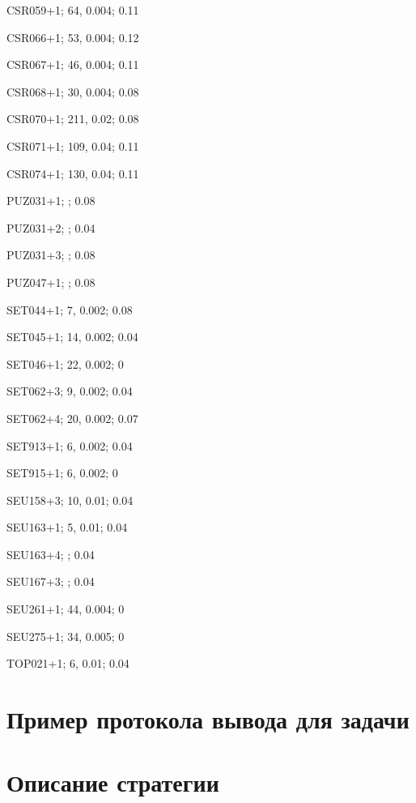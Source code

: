 CSR059+1; 64, 0.004; 0.11

CSR066+1; 53, 0.004; 0.12

CSR067+1; 46, 0.004; 0.11

CSR068+1; 30, 0.004; 0.08

CSR070+1; 211, 0.02; 0.08

CSR071+1; 109, 0.04; 0.11

CSR074+1; 130, 0.04; 0.11




PUZ031+1;	; 0.08

PUZ031+2;	; 0.04

PUZ031+3;	; 0.08

PUZ047+1;	; 0.08




SET044+1; 7, 0.002; 0.08

SET045+1; 14, 0.002; 0.04

SET046+1; 22, 0.002; 0

SET062+3; 9, 0.002; 0.04

SET062+4; 20, 0.002; 0.07

SET913+1; 6, 0.002; 0.04

SET915+1; 6, 0.002; 0



SEU158+3; 10, 0.01; 0.04

SEU163+1; 5, 0.01; 0.04

SEU163+4; ; 0.04

SEU167+3; ; 0.04

SEU261+1; 44, 0.004; 0

SEU275+1; 34, 0.005; 0



TOP021+1; 6, 0.01; 0.04

\section*{Пример протокола вывода для задачи}


\section*{Описание стратегии}



